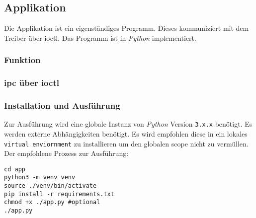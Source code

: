 \subsection{Applikation}

Die Applikation ist ein eigenständiges Programm.
Dieses kommuniziert mit dem Treiber über \gls{ioctl}.
Das Programm ist in \textit{Python} implementiert.

\subsubsection{Funktion}

\subsubsection{\acrshort{ipc} über \acrshort{ioctl}}

\subsubsection{Installation und Ausführung}

Zur Ausführung wird eine globale Instanz von \textit{Python} Version \texttt{3.x.x} benötigt.
Es werden externe Abhängigkeiten benötigt.
Es wird empfohlen diese in ein lokales \texttt{virtual enviornment} zu installieren um den globalen scope nicht zu vermüllen.
Der empfohlene Prozess zur Ausführung:
\begin{lstlisting}
cd app
python3 -m venv venv
source ./venv/bin/activate
pip install -r requirements.txt
chmod +x ./app.py #optional
./app.py
\end{lstlisting}
